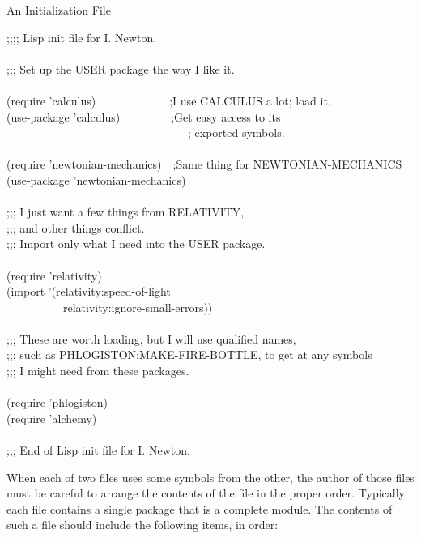 \begin{table}[t]
\caption{An Initialization File}
\label{INIT-FILE-TABLE}
\begin{lisp}
;;;; Lisp init file for I. Newton. \\
 \\
;;; Set up the USER package the way I like it. \\
 \\
(require 'calculus)~~~~~~~~~~~~~;I use CALCULUS a lot; load it. \\
(use-package 'calculus)~~~~~~~~~;Get easy access to its \\
~~~~~~~~~~~~~~~~~~~~~~~~~~~~~~~~; exported symbols. \\
 \\
(require 'newtonian-mechanics)~~;Same thing for NEWTONIAN-MECHANICS \\
(use-package 'newtonian-mechanics) \\
 \\
;;; I just want a few things from RELATIVITY, \\
;;; and other things conflict. \\
;;; Import only what I need into the USER package. \\
 \\
(require 'relativity) \\
(import '(relativity:speed-of-light \\
~~~~~~~~~~relativity:ignore-small-errors)) \\
 \\
;;; These are worth loading, but I will use qualified names, \\
;;; such as PHLOGISTON:MAKE-FIRE-BOTTLE, to get at any symbols \\
;;; I might need from these packages. \\
 \\
(require 'phlogiston) \\
(require 'alchemy) \\
 \\
;;; End of Lisp init file for I. Newton.
\end{lisp}
\end{table}

When each of two files uses some symbols from the other, the author
of those files must be
careful to arrange the contents of the file in the proper order.
Typically each file contains a single package that is a complete module.
The contents of such a file should include the following items, in
order:

